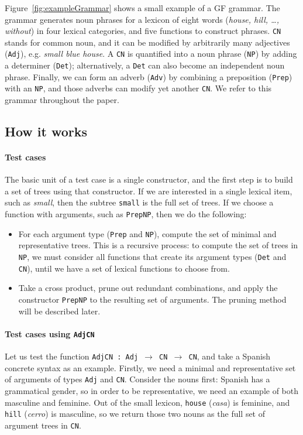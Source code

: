 \documentclass[11pt]{article}
\def\t#1{\texttt{#1}}
\begin{document}
Figure~\ref{fig:exampleGrammar} shows a small example of a GF
grammar. The grammar generates noun phrases for a lexicon of eight words (\emph{house, hill, \dots, without}) in four lexical categories, and five functions to construct phrases. 
\t{CN} stands for common noun, and it can be modified by arbitrarily many adjectives (\t{Adj}), e.g. \emph{small blue house}. A \t{CN} is quantified into a noun phrase (\t{NP}) by adding a determiner (\t{Det}); alternatively, a \t{Det} can also become an independent noun phrase. Finally, we can form an adverb (\t{Adv}) by combining a preposition (\t{Prep}) with an \t{NP}, and those adverbs can modify yet another \t{CN}.
We refer to this grammar throughout the paper.

\subsection{How it works}

\paragraph{Test cases} 
The basic unit of a test case is a single constructor, and the first step 
is to build a set of trees using that constructor.
If we are interested in a single lexical item, such as \emph{small}, 
then the subtree \t{small} is the full set of trees. If we choose a function 
with arguments, such as \t{PrepNP}, then we do the following: 
\begin{itemize}
\item For each argument type (\t{Prep} and \t{NP}), compute the
  set of minimal and representative trees. This is a recursive
  process: to compute the set of trees in \t{NP}, we must consider
  all functions that create its argument types (\t{Det} and \t{CN}), until we
  have a set of lexical functions to choose from. 
\item Take a cross product, prune out redundant combinations, and apply the constructor \t{PrepNP} to the resulting set of arguments. The pruning method will be described later.
\end{itemize}

\paragraph{Test cases using \t{AdjCN}} Let us test the function
\t{AdjCN : Adj $\rightarrow$ CN $\rightarrow$ CN}, and take a Spanish concrete syntax as an example.
Firstly, we need a minimal and representative set of arguments of types
\t{Adj} and \t{CN}. Consider the nouns first: Spanish has a grammatical gender, so in order to be representative, we need an example of both masculine and feminine. Out of the small lexicon, \t{house} (\emph{casa}) is feminine, and \t{hill} (\emph{cerro}) is masculine, so we return those two nouns as the full set of argument trees in \t{CN}.
\end{document}
